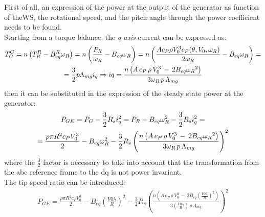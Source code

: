 First of all, an expression of the power at the output of the generator as function of theWS, the rotational speed, and the pitch angle through the power coefficient needs to be found. \\
Starting from a torque balance, the \textit{q-axis} current can be expressed as:
\begin{gather}
  T_G^G = n\left(T_R^R - B_{eq}^R\omega_R\right) = n\left(\frac{P_R}{\omega_R} - B_{eq}\omega_R\right) = n\left(\frac{A c_P \rho V_0^3 c_P(\theta, V_0, \omega_R)}{2\omega_R} - B_{eq}\omega_R\right) = \notag \\
   = \frac{3}{2}p\Lambda_{mg}i_q \Rightarrow iq = \frac{n\left(A \, c_P \, \rho \, V_0^3 \,-\,2B_{eq}{\omega_R}^2\right)}{3\omega_R\,p\,\Lambda_{mg}} 
\end{gather}
then it can be substituted in the expression of the steady state power at the generator:
\begin{gather}
  P_{GE} = P_{G} - \frac{3}{2} R_s i_q^2 = P_R - B_{eq}\omega_R^2 - \frac{3}{2} R_s i_q^2 = \\ \notag
  =\frac{\rho\pi R^2c_PV_0^3}{2} - B_{eq}\omega_R^2-\frac{3}{2}R_s\left(\frac{n\left(A \, c_P \, \rho \, V_0^3 \,-\,2B_{eq}{\omega_R}^2\right)}{3\omega_R\,p\,\Lambda_{mg}}\right)^2 \notag \label{eq:P_G_out_eq}
\end{gather}
where the $\frac{3}{2}$ factor is necessary to take into account that the transformation from the abc reference frame to the dq is not power invariant.\\
The tip speed ratio can be introduced:
\begin{gather}
  P_{GE} = \frac{\rho\pi R^2c_PV_0^3}{2} - B_{eq}\left(\frac{V0\lambda}{R}\right)^2-\frac{3}{2}R_s\left(\frac{n\left(A \, c_P \, \rho \, V_0^3 \,-\,2B_{eq}{\left(\frac{V0\lambda}{R}\right)}^2\right)}{3\left(\frac{V0\lambda}{R}\right)\,p\,\Lambda_{mg}}\right)^2 \label{eq:P_G_out_lambda}
\end{gather} 


